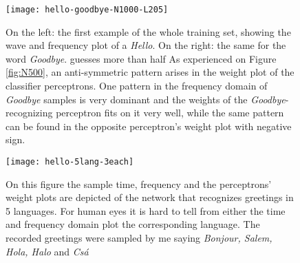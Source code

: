 \begin{figure}
	\centering
	\texttt{[image: hello-goodbye-N1000-L205]}
	\caption{On the left: the first example of the whole training set, showing the wave and frequency plot of a \emph{Hello}. On the right: the same for the word \emph{Goodbye}. guesses more than half 
	As experienced on Figure \ref{fig:N500}, an anti-symmetric pattern arises in the weight plot of the classifier perceptrons. 
	One pattern in the frequency domain of \emph{Goodbye} samples is very dominant and the weights of the \emph{Goodbye}-recognizing perceptron fits on it very well, while the same pattern can be found in the opposite perceptron's weight plot with negative sign.}
	
	\label{fig:hello}
\end{figure}

\begin{figure}
	\centering
	\texttt{[image: hello-5lang-3each]}
	\caption{On this figure the sample time, frequency and the perceptrons' weight plots are depicted of the network that recognizes greetings in 5 languages. For human eyes it is hard to tell from either the time and frequency domain plot the corresponding language. The recorded greetings were sampled by me saying \emph{Bonjour, Salem, Hola, Halo} and \emph{Csá}}
	
	\label{fig:hello5}
\end{figure}
